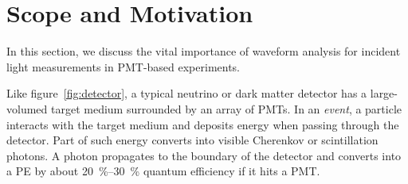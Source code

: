 \section{Scope and Motivation}
\label{sec:toyMC}

In this section, we discuss the vital importance of waveform analysis for incident light measurements in PMT-based experiments.

Like figure~\ref{fig:detector}, a typical neutrino or dark matter detector has a large-volumed target medium surrounded by an array of PMTs. In an \textit{event}, a particle interacts with the target medium and deposits energy when passing through the detector. Part of such energy converts into visible Cherenkov or scintillation photons. A photon propagates to the boundary of the detector and converts into a PE by about \SIrange{20}{30}{\percent} quantum efficiency if it hits a PMT.

